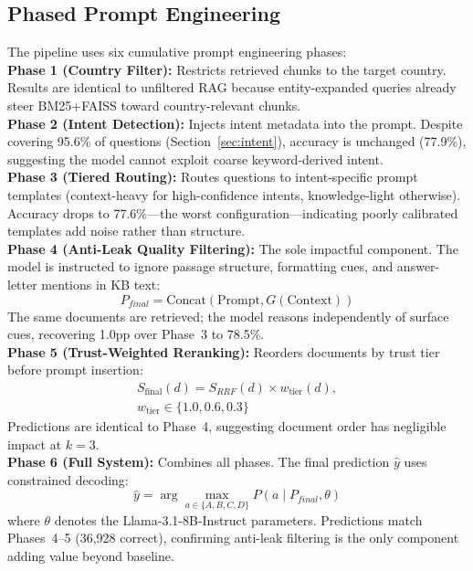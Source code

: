 \documentclass[11pt,a4paper]{article}
\begin{document}
\subsection{Phased Prompt Engineering}
\label{sec:phased}
The pipeline uses six cumulative prompt engineering phases:
\\
\textbf{Phase 1 (Country Filter):} Restricts retrieved chunks to the target country. Results are identical to unfiltered RAG because entity-expanded queries already steer BM25+FAISS toward country-relevant chunks.
\\
\textbf{Phase 2 (Intent Detection):} Injects intent metadata into the prompt. Despite covering 95.6\% of questions (Section~\ref{sec:intent}), accuracy is unchanged (77.9\%), suggesting the model cannot exploit coarse keyword-derived intent.
\\
\textbf{Phase 3 (Tiered Routing):} Routes questions to intent-specific prompt templates (context-heavy for high-confidence intents, knowledge-light otherwise). Accuracy drops to 77.6\%---the worst configuration---indicating poorly calibrated templates add noise rather than structure.
\\
\textbf{Phase 4 (Anti-Leak Quality Filtering):} The sole impactful component. The model is instructed to ignore passage structure, formatting cues, and answer-letter mentions in KB text:
\begin{equation}
    P_{final} = \text{Concat}(\text{Prompt}, G(\text{Context}))
\end{equation}
The same documents are retrieved; the model reasons independently of surface cues, recovering 1.0pp over Phase~3 to 78.5\%.
\\
\textbf{Phase 5 (Trust-Weighted Reranking):} Reorders documents by trust tier before prompt insertion:
\begin{equation}
\begin{split}
    S_{\text{final}}(d) = S_{RRF}(d) \times w_{\text{tier}}(d),\\
    w_{\text{tier}} \in \{1.0, 0.6, 0.3\}
\end{split}
\end{equation}
Predictions are identical to Phase~4, suggesting document order has negligible impact at $k=3$.
\\
\textbf{Phase 6 (Full System):} Combines all phases. The final prediction $\hat{y}$ uses constrained decoding:
\begin{equation}
    \hat{y} = \arg\max_{a \in \{A,B,C,D\}} P(a \mid P_{final}, \theta)
\end{equation}
where $\theta$ denotes the Llama-3.1-8B-Instruct \cite{meta2024llama} parameters. Predictions match Phases~4--5 (36,928 correct), confirming anti-leak filtering is the only component adding value beyond baseline.
\end{document}
